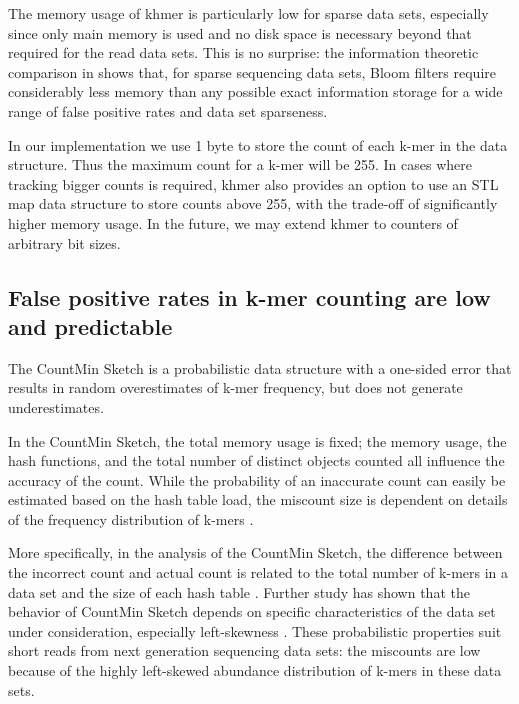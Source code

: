 \documentclass[10pt]{article}
\begin{document}
The memory usage of khmer is particularly low for sparse data sets,
especially since only main memory is used and no disk space is
necessary beyond that required for the read data sets.  This is no
surprise: the information theoretic comparison in \cite{Pell2012}
shows that, for sparse sequencing data sets, Bloom filters require
considerably less memory than any possible exact information storage
for a wide range of false positive rates and data set sparseness.

In our implementation we use 1 byte to store the count of each k-mer
in the data structure. Thus the maximum count for a k-mer will be 255.
In cases where tracking bigger counts is required, khmer also provides
an option to use an STL map data structure to store counts above 255,
with the trade-off of significantly higher memory usage.  In the
future, we may extend khmer to counters of arbitrary bit sizes.


\subsection*{False positive rates in k-mer counting are low and predictable}

The CountMin Sketch is a probabilistic data structure with a one-sided
error that results in random overestimates of k-mer frequency, but
does not generate underestimates.

In the CountMin Sketch, the total memory usage is fixed; the memory
usage, the hash functions, and the total number of distinct objects
counted all influence the accuracy of the count.  While the
probability of an inaccurate count can easily be estimated based on
the hash table load, the miscount size is dependent on details of the
frequency distribution of k-mers \cite{Cormode2005}.

More specifically, in the analysis of the CountMin Sketch, the
difference between the incorrect count and actual count is related to
the total number of k-mers in a data set and the size of each hash
table \cite{Cormode2005}. Further study has shown that the behavior of
CountMin Sketch depends on specific characteristics of the data set
under consideration, especially left-skewness \cite{Rusu2008,
  CormodeM05}.  These probabilistic properties suit short reads from
next generation sequencing data sets: the miscounts are low because of
the highly left-skewed abundance distribution of k-mers in these data
sets.
\end{document}
